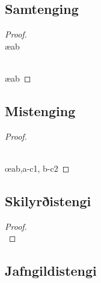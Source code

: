 \begin{multicols}{2}

\subsection*{Samtenging}

\begin{proof}
	 

\\	 \ae{ab}

\\	 \ae{ab}
\end{proof}

\subsection*{Mistenging}

\begin{proof}

\\	

\\	\open
	\close
	\open
	\close
	 \oe{ab,a-c1, b-c2}
\end{proof}

\subsection*{Skilyrðistengi}

\begin{proof}
	\open
	\close
	
	\\	
	 
\end{proof}

\subsection*{Jafngildistengi}


\end{multicols}
